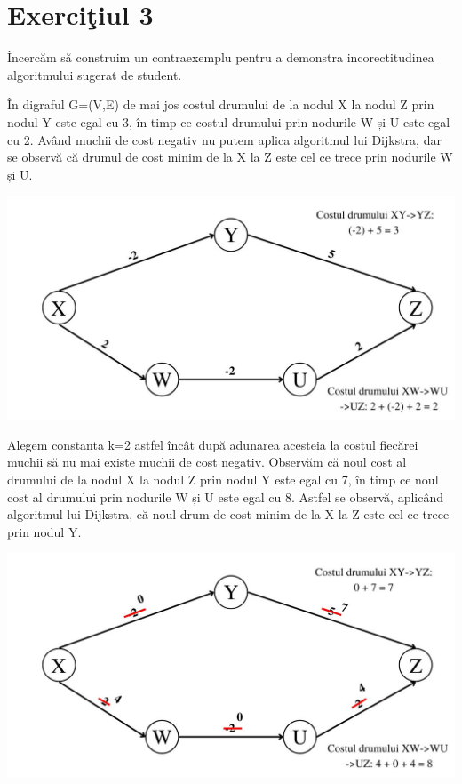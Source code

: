 \documentclass[12pt]{article}
\begin{document}
\section{Exerci\c{t}iul 3}
 
\^{I}ncerc\u{a}m s\u{a} construim un contraexemplu pentru a demonstra incorectitudinea algoritmului sugerat de student. 

\^{I}n digraful G=(V,E) de mai jos costul drumului de la nodul X la nodul Z prin nodul Y este egal cu 3, în timp ce costul drumului prin nodurile W și U este egal cu 2. Având muchii de cost negativ nu putem aplica algoritmul lui Dijkstra, dar se observă c\u{a} drumul de cost minim de la X la Z este cel ce trece prin nodurile W și U.

\includegraphics[scale=0.3]{313090941_827984621846159_5439754781801344054_n}

Alegem constanta k=2 astfel încât după adunarea acesteia la costul fiecărei muchii să nu mai existe muchii de cost negativ. Observăm că noul cost al drumului de la nodul X la nodul Z prin nodul Y este egal cu 7, în timp ce noul cost al drumului prin nodurile W și U este egal cu 8. Astfel se observă, aplicând algoritmul lui Dijkstra, că noul drum de cost minim de la X la Z este cel ce trece prin nodul Y.

\includegraphics[scale=0.3]{307936481_3056475277977140_961538295951200335_n}
\end{document}
